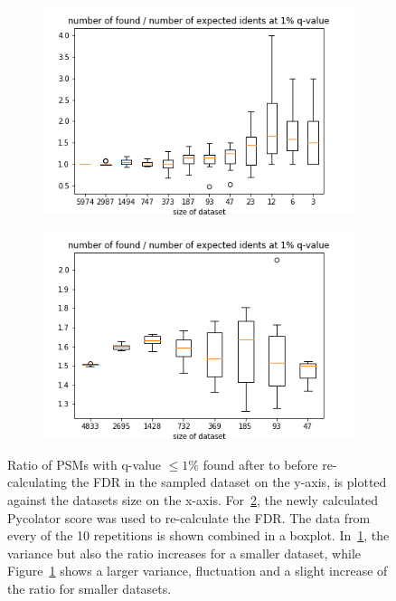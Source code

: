 \begin{figure}
	\normalsize
	\centering
	\begin{subfigure}{0.49 \textwidth}
		\includegraphics[width = \textwidth]{figures/found_vs_expected_dxl.png}
		\caption{}
		\label{fig:results:small_dataset_snd_found_dxl}
	\end{subfigure}
	\hfill
	\begin{subfigure}{0.49 \textwidth}
		\includegraphics[width = \textwidth]{figures/found_vs_expected_pxl.png}
		\caption{}
		\label{fig:results:small_dataset_snd_found_pxl}
	\end{subfigure}
	\caption[Found vs expected number of high confidence PSMs]{Ratio of PSMs with q-value $\leq1\%$ found after to before re-calculating the FDR in the sampled dataset on the y-axis, is plotted against the datasets size on the x-axis. For~\ref{fig:results:small_dataset_snd_found_pxl}, the newly calculated Pycolator score was used to re-calculate the FDR. The data from every of the 10 repetitions is shown combined in a boxplot. In~\ref{fig:results:small_dataset_snd_found_dxl}, the variance but also the ratio increases for a smaller dataset, while Figure~\ref{fig:results:small_dataset_snd_found_dxl} shows a larger variance, fluctuation and a slight increase of the ratio for smaller datasets.}
	\label{fig:results:small_dataset_snd_found}
\end{figure}
